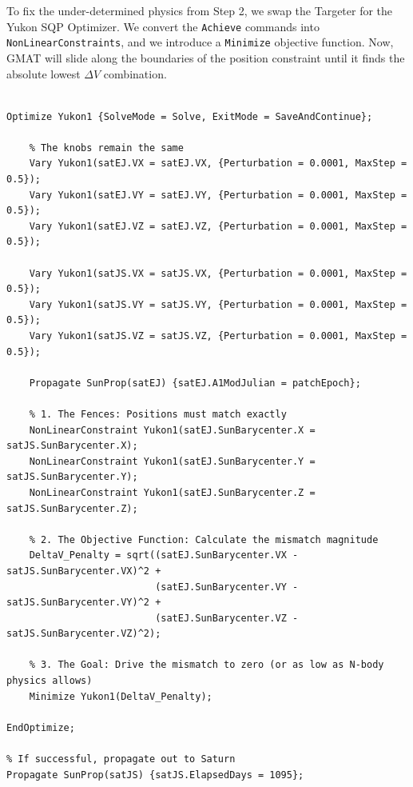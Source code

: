 \documentclass[11pt, letterpaper]{article}
\begin{document}
To fix the under-determined physics from Step 2, we swap the Targeter for the Yukon SQP Optimizer. We convert the \texttt{Achieve} commands into \texttt{NonLinearConstraints}, and we introduce a \texttt{Minimize} objective function. Now, GMAT will slide along the boundaries of the position constraint until it finds the absolute lowest $\Delta V$ combination.

\begin{lstlisting}[caption=Mission Sequence: Yukon Optimizer]
% (Replace the Target block with this Optimize block)

Optimize Yukon1 {SolveMode = Solve, ExitMode = SaveAndContinue};
    
    % The knobs remain the same
    Vary Yukon1(satEJ.VX = satEJ.VX, {Perturbation = 0.0001, MaxStep = 0.5});
    Vary Yukon1(satEJ.VY = satEJ.VY, {Perturbation = 0.0001, MaxStep = 0.5});
    Vary Yukon1(satEJ.VZ = satEJ.VZ, {Perturbation = 0.0001, MaxStep = 0.5});
    
    Vary Yukon1(satJS.VX = satJS.VX, {Perturbation = 0.0001, MaxStep = 0.5});
    Vary Yukon1(satJS.VY = satJS.VY, {Perturbation = 0.0001, MaxStep = 0.5});
    Vary Yukon1(satJS.VZ = satJS.VZ, {Perturbation = 0.0001, MaxStep = 0.5});

    Propagate SunProp(satEJ) {satEJ.A1ModJulian = patchEpoch};

    % 1. The Fences: Positions must match exactly
    NonLinearConstraint Yukon1(satEJ.SunBarycenter.X = satJS.SunBarycenter.X);
    NonLinearConstraint Yukon1(satEJ.SunBarycenter.Y = satJS.SunBarycenter.Y);
    NonLinearConstraint Yukon1(satEJ.SunBarycenter.Z = satJS.SunBarycenter.Z);

    % 2. The Objective Function: Calculate the mismatch magnitude
    DeltaV_Penalty = sqrt((satEJ.SunBarycenter.VX - satJS.SunBarycenter.VX)^2 + 
                          (satEJ.SunBarycenter.VY - satJS.SunBarycenter.VY)^2 + 
                          (satEJ.SunBarycenter.VZ - satJS.SunBarycenter.VZ)^2);

    % 3. The Goal: Drive the mismatch to zero (or as low as N-body physics allows)
    Minimize Yukon1(DeltaV_Penalty);

EndOptimize;

% If successful, propagate out to Saturn
Propagate SunProp(satJS) {satJS.ElapsedDays = 1095};
\end{lstlisting}
\end{document}
